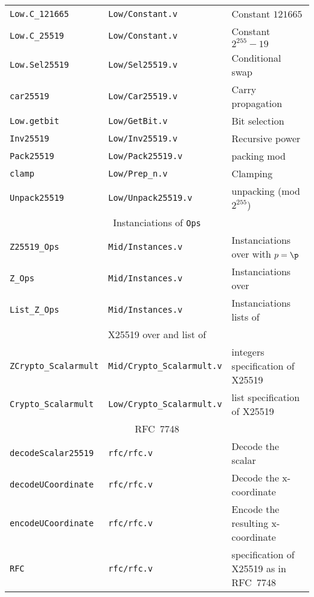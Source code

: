 \begin{table*}[h]
\begin{tabular}{ l | l | l }
    \texttt{Low.C\_121665} & \texttt{Low/Constant.v} & Constant $121665$\\
    \texttt{Low.C\_25519} & \texttt{Low/Constant.v} & Constant $2^{255}-19$\\
    \texttt{Low.Sel25519} & \texttt{Low/Sel25519.v} & Conditional swap \\
    \texttt{car25519} & \texttt{Low/Car25519.v} & Carry propagation \\
    \texttt{Low.getbit} & \texttt{Low/GetBit.v} & Bit selection \\
    \texttt{Inv25519} & \texttt{Low/Inv25519.v} & Recursive power \\
    \texttt{Pack25519} & \texttt{Low/Pack25519.v} & packing mod \p\\
    \texttt{clamp} & \texttt{Low/Prep\_n.v} & Clamping \\
    \texttt{Unpack25519} & \texttt{Low/Unpack25519.v} & unpacking (mod $2^{255}$)\\
    \hline
    \multicolumn{3}{c}{Instanciations of \texttt{Ops}}\\
    \hline
    \texttt{Z25519\_Ops} & \texttt{Mid/Instances.v} & Instanciations over \F{p} with $p = \p$\\
    \texttt{Z\_Ops} & \texttt{Mid/Instances.v} & Instanciations over \Z \\
    \texttt{List\_Z\_Ops} & \texttt{Mid/Instances.v} & Instanciations lists of \Z \\
    \hline
    \multicolumn{3}{c}{X25519 over \Z and list of \Z}\\
    \hline
    \texttt{ZCrypto\_Scalarmult} & \texttt{Mid/Crypto\_Scalarmult.v} & integers specification of X25519\\
    \texttt{Crypto\_Scalarmult} & \texttt{Low/Crypto\_Scalarmult.v} & list specification of X25519\\
    \hline
    \multicolumn{3}{c}{RFC~7748}\\
    \hline
    \texttt{decodeScalar25519} & \texttt{rfc/rfc.v} & Decode the scalar\\
    \texttt{decodeUCoordinate} & \texttt{rfc/rfc.v} & Decode the x-coordinate\\
    \texttt{encodeUCoordinate} & \texttt{rfc/rfc.v} & Encode the resulting x-coordinate\\
    \texttt{RFC} & \texttt{rfc/rfc.v} & specification of X25519 as in RFC~7748\\
    \hline
\end{tabular}
\end{table*}

